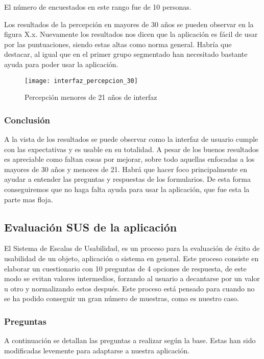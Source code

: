 El número de encuestados en este rango fue de 10 personas.

Los resultados de la percepción en mayores de 30 años se pueden observar en la figura X.x.
Nuevamente los resultados nos dicen que la aplicación es fácil de usar por las puntuaciones,
siendo estas altas como norma general. Habría que destacar, al igual que en el primer grupo segmentado
han necesitado bastante ayuda para poder usar la aplicación.

\begin{figure}[htb]
  \centering
  \texttt{[image: interfaz\_percepcion\_30]}
  \caption[Percepción mayores de 30 años de interfaz]{Percepción menores de 21 años de interfaz}
  \label{fig:Percepción mayores de 30 años de interfaz}
\end{figure}

\subsubsection{Conclusión}
A la vista de los resultados se puede observar como la interfaz de usuario cumple
con las expectativas y es usable en su totalidad. A pesar de los buenos resultados
es apreciable como faltan cosas por mejorar, sobre todo aquellas enfocadas a los
mayores de 30 años y menores de 21. Habrá que hacer foco principalmente en
ayudar a entender las preguntas y respuestas de los formularios. De esta forma
conseguiremos que no haga falta ayuda para usar la aplicación, que fue esta
la parte mas floja.

\subsection{Evaluación SUS de la aplicación}
El Sistema de Escalas de Usabilidad, es un proceso para la evaluación de éxito
de usabilidad de un objeto, aplicación o sistema en general. Este proceso consiste
en elaborar un cuestionario con 10 preguntas de 4 opciones de respuesta, de este modo
se evitan valores intermedios, forzando al usuario a decantarse por un valor u otro y
normalizando estos después. Este proceso está pensado para cuando no se ha podido
conseguir un gran número de muestras, como es nuestro caso.

\subsubsection{Preguntas}
A continuación se detallan las preguntas a realizar según la base. Estas han sido modificadas
levemente para adaptarse a nuestra aplicación.

